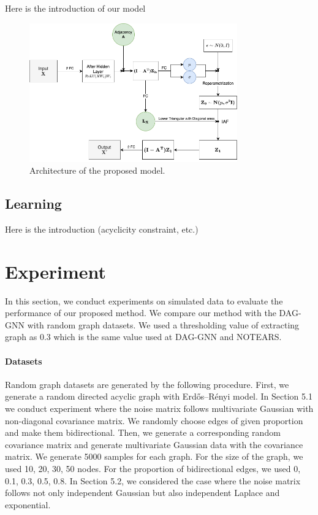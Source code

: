 \documentclass[10pt]{article}
\begin{document}
Here is the introduction of our model

\begin{figure}
    \centering
    \includegraphics[width=0.8\textwidth]{fig/model.png}
    \caption{Architecture of the proposed model.}
    \label{diagram}
\end{figure}

\subsection{Learning}

Here is the introduction (acyclicity constraint, etc.)

\section{Experiment}

In this section, we conduct experiments on simulated data to evaluate the performance of our proposed method. We compare our method with the DAG-GNN \cite{yu2019daggnn} with random graph datasets. We used a thresholding value of extracting graph as 0.3 which is the same value used at DAG-GNN and NOTEARS.\\ 

\paragraph*{Datasets} Random graph datasets are generated by the following procedure. First, we generate a random directed acyclic graph with Erdős–Rényi model. In Section 5.1 we conduct experiment where the noise matrix follows multivariate Gaussian with non-diagonal covariance matrix. We randomly choose edges of given proportion and make them bidirectional. Then, we generate a corresponding random covariance matrix and generate multivariate Gaussian data with the covariance matrix. We generate 5000 samples for each graph. For the size of the graph, we used 10, 20, 30, 50 nodes. For the proportion of bidirectional edges, we used 0, 0.1, 0.3, 0.5, 0.8. In Section 5.2, we considered the case where the noise matrix follows not only independent Gaussian but also independent Laplace and exponential.\\
\end{document}
